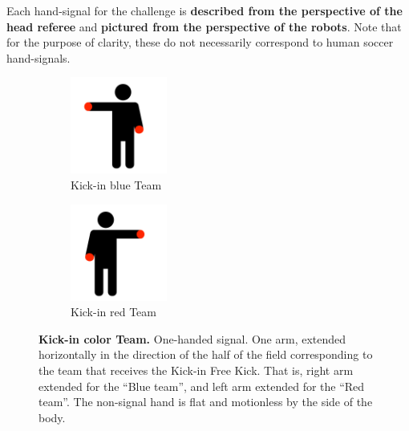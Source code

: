 Each hand-signal for the challenge is \textbf{described from the perspective of the head referee} and \textbf{pictured from the perspective of the robots}. Note that for the purpose of clarity, these do not necessarily correspond to human soccer hand-signals.

\begin{figure}[ht!]
    \centering
    \begin{subfigure}{.33\textwidth}
        \centering
        \includegraphics[height=120px]{figs/technical_challenges/kick-in.png}
        \caption{\color{blue}Kick-in \textlangle{}blue\textrangle{} Team}
    \end{subfigure}
    \begin{subfigure}{.33\textwidth}
        \centering
        \includegraphics[height=120px]{figs/technical_challenges/kick-in-flipped.png}
        \caption{\color{red}Kick-in \textlangle{}red\textrangle{} Team}
    \end{subfigure}
    \caption{\textbf{Kick-in \textlangle{}color\textrangle{} Team.} One-handed signal. One arm, extended horizontally in the direction of the half of the field corresponding to the team that receives the Kick-in Free Kick. That is, right arm extended for the ``Blue team'', and left arm extended for the ``Red team''. The non-signal hand is flat and motionless by the side of the body.}
\end{figure}
    
